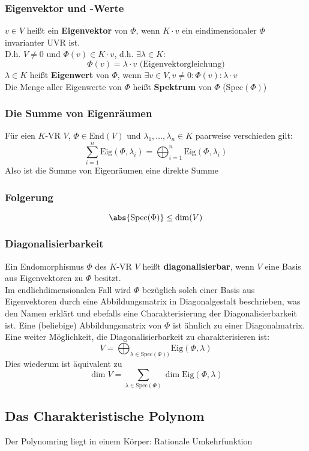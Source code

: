 \documentclass{kit}
\begin{document}
    \subsubsection{Eigenvektor und -Werte}
      $v\in V$ heißt ein \textbf{Eigenvektor} von $\Phi$, wenn $K\cdot v$ ein eindimensionaler $\Phi$ invarianter UVR ist.\\
      D.h. $V\neq0$ und $\Phi(v)\in K\cdot v$, d.h. $\exists\lambda\in K:$
      $$\Phi(v)=\lambda\cdot v\text{ (Eigenvektorgleichung)}$$
      $\lambda\in K$ heißt \textbf{Eigenwert} von $\Phi$, wenn $\exists v\in V,v\neq0:\Phi(v):\lambda\cdot v$\\
      Die Menge aller Eigenwerte von $\Phi$ heißt \textbf{Spektrum} von $\Phi$ (Spec$(\Phi)$)
    \subsubsection{Die Summe von Eigenräumen}
      Für eien $K$-VR $V$, $\Phi\in\text{End}(V)$ und $\lambda_1,\dots,\lambda_n\in K$ paarweise verschieden gilt:
      $$\sum_{i=1}^n\text{Eig}(\Phi,\lambda_i)=\bigoplus_{i=1}^n\text{Eig}(\Phi,\lambda_i)$$
      Also ist die Summe von Eigenräumen eine direkte Summe
    \subsubsection{Folgerung}
      $$\abs{\text{Spec}(\Phi)}\le\dim(V)$$
    \subsubsection{Diagonalisierbarkeit}
      Ein Endomorphismus $\Phi$ des $K$-VR $V$ heißt \textbf{diagonalisierbar}, wenn $V$ eine Basis aus Eigenvektoren zu $\Phi$ besitzt.\\
      Im endlichdimensionalen Fall wird $\Phi$ bezüglich solch einer Basis aus Eigenvektoren durch eine Abbildungsmatrix in Diagonalgestalt beschrieben, 
      was den Namen erklärt und ebefalls eine Charakterisierung der Diagonalisierbarkeit ist.
      Eine (beliebige) Abbildungsmatrix von $\Phi$ ist ähnlich zu einer Diagonalmatrix.\\
      Eine weiter Möglichkeit, die Diagonalisierbarkeit zu charakterisieren ist:
      $$V=\bigoplus_{\lambda\in\text{Spec}(\Phi))}\text{Eig}(\Phi,\lambda)$$
      Dies wiederum ist äquivalent zu
      $$\dim V=\sum_{\lambda\in\text{Spec}(\Phi)}\dim\text{Eig}(\Phi,\lambda)$$
  \subsection{Das Charakteristische Polynom}
    Der Polynomring liegt in einem Körper: Rationale Umkehrfunktion
\end{document}
